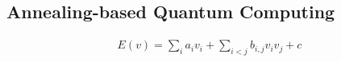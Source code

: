 \subsection{Annealing-based Quantum Computing}
\label{backg:annealing}


\begin{align}
  \label{formula:dqm.form}
  E(v) = \sum_i a_i v_i + \sum_{i < j} b_{i, j} v_i v_j + c
\end{align}
